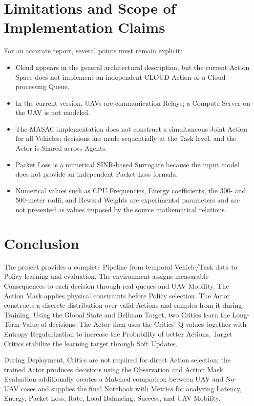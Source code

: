 \documentclass[a4paper,12pt]{article}
\begin{document}
\section{Limitations and Scope of Implementation Claims}
For an accurate report, several points must remain explicit:
\begin{itemize}
    \item Cloud appears in the general architectural description, but the current Action Space does not implement an independent CLOUD Action or a Cloud processing Queue.
    \item In the current version, UAVs are communication Relays; a Compute Server on the UAV is not modeled.
    \item The MASAC implementation does not construct a simultaneous Joint Action for all Vehicles; decisions are made sequentially at the Task level, and the Actor is Shared across Agents.
    \item Packet Loss is a numerical SINR-based Surrogate because the input model does not provide an independent Packet-Loss formula.
    \item Numerical values such as CPU Frequencies, Energy coefficients, the 300- and 500-meter radii, and Reward Weights are experimental parameters and are not presented as values imposed by the source mathematical relations.
\end{itemize}

\section{Conclusion}
The project provides a complete Pipeline from temporal Vehicle/Task data to Policy learning and evaluation. The environment assigns measurable Consequences to each decision through real queues and UAV Mobility. The Action Mask applies physical constraints before Policy selection. The Actor constructs a discrete distribution over valid Actions and samples from it during Training. Using the Global State and Bellman Target, two Critics learn the Long-Term Value of decisions. The Actor then uses the Critics' Q-values together with Entropy Regularization to increase the Probability of better Actions. Target Critics stabilize the learning target through Soft Updates.

During Deployment, Critics are not required for direct Action selection; the trained Actor produces decisions using the Observation and Action Mask. Evaluation additionally creates a Matched comparison between UAV and No-UAV cases and supplies the final Notebook with Metrics for analyzing Latency, Energy, Packet Loss, Rate, Load Balancing, Success, and UAV Mobility.
\end{document}

